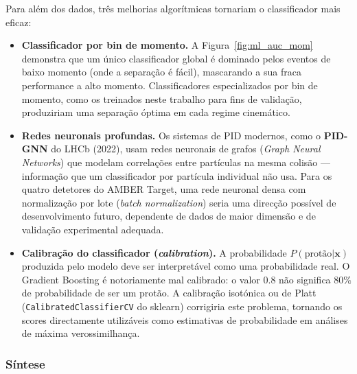 \documentclass[12pt,a4paper]{article}
\begin{document}
Para além dos dados, três melhorias algorítmicas tornariam o classificador
mais eficaz:

\begin{itemize}

  \item \textbf{Classificador por bin de momento.}
    A Figura~\ref{fig:ml_auc_mom} demonstra que um único classificador global
    é dominado pelos eventos de baixo momento (onde a separação é fácil),
    mascarando a sua fraca performance a alto momento. Classificadores
    especializados por bin de momento, como os treinados neste trabalho para
    fins de validação, produziriam uma separação óptima em cada regime
    cinemático.

  \item \textbf{Redes neuronais profundas.}
    Os sistemas de PID modernos, como o \textbf{PID-GNN} do LHCb (2022),
    usam redes neuronais de grafos (\textit{Graph Neural Networks}) que
    modelam correlações entre partículas na mesma colisão ---
    informação que um classificador por partícula individual não usa.
    Para os quatro detetores do AMBER Target, uma rede neuronal densa
    com normalização por lote (\textit{batch normalization}) seria uma
    direcção possível de desenvolvimento futuro, dependente de dados de
    maior dimensão e de validação experimental adequada.

  \item \textbf{Calibração do classificador (\textit{calibration}).}
    A probabilidade $P(\text{protão} | \mathbf{x})$ produzida pelo modelo
    deve ser interpretável como uma probabilidade real. O Gradient Boosting
    é notoriamente mal calibrado: o valor $0.8$ não significa $80\%$ de
    probabilidade de ser um protão. A calibração isotónica ou de Platt
    (\texttt{CalibratedClassifierCV} do sklearn) corrigiria este problema,
    tornando os scores directamente utilizáveis como estimativas de
    probabilidade em análises de máxima verossimilhança.

\end{itemize}

\subsubsection{Síntese}
\end{document}
